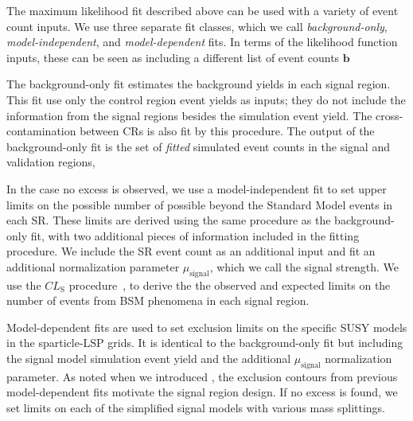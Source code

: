 The maximum likelihood fit described above can be used with a variety of event count inputs.
We use three separate fit classes, which we call \textit{background-only}, \textit{model-independent}, and \textit{model-dependent} fits.
In terms of the likelihood function inputs, these can be seen as including a different list of event counts $\bm{b}$

The background-only fit estimates the background yields in each signal region.
This fit use only the control region event yields as inputs; they do not include the information from the signal regions besides the simulation event yield.
The cross-contamination between CRs is also fit by this procedure.
The output of the background-only fit is the set of \textit{fitted} simulated event counts in the signal and validation regions,

In the case no excess is observed, we use a model-independent fit to set upper limits on the possible number of possible beyond the Standard Model events in each SR.
These limits are derived using the same procedure as the background-only fit, with two additional pieces of information included in the fitting procedure.
We include the SR event count as an additional input and fit an additional normalization parameter $\mu_{\text{signal}}$, which we call the signal strength.
We use the $CL_{\mathrm{S}}$ procedure~\cite{Feldman:1997qc}, to derive the the observed and expected limits on the number of events from BSM phenomena in each signal region.

Model-dependent fits are used to set exclusion limits on the specific SUSY models in the sparticle-LSP grids.
It is identical to the background-only fit but including the signal model simulation event yield and the additional $\mu_{\text{signal}}$ normalization parameter.
As noted when we introduced , the exclusion contours from previous model-dependent fits motivate the signal region design.
If no excess is found, we set limits on each of the simplified signal models with various mass splittings.
